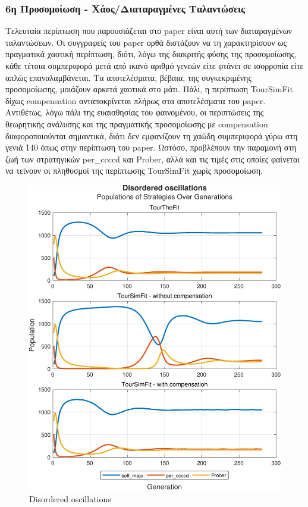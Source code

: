 \documentclass[12pt]{article}
\begin{document}
\subsubsection{6η Προσομοίωση - Χάος/Διαταραγμένες Ταλαντώσεις}
Τελευταία περίπτωση που παρουσιάζεται στο paper είναι αυτή των διαταραγμένων ταλαντώσεων. Οι συγγραφείς του paper ορθά διστάζουν να τη χαρακτηρίσουν ως πραγματικά χαοτική περίπτωση, διότι, λόγω της διακριτής φύσης της προσομοίωσης, κάθε τέτοια συμπεριφορά μετά από ικανό αριθμό γενεών είτε φτάνει σε ισορροπία είτε απλώς επαναλαμβάνεται. Τα αποτελέσματα, βέβαια, της συγκεκριμένης προσομοίωσης, μοιάζουν αρκετά χαοτικά στο μάτι. Πάλι, η περίπτωση TourSimFit δίχως compensation ανταποκρίνεται πλήρως στα αποτελέσματα του paper. Αντιθέτως, λόγω πάλι της ευαισθησίας του φαινομένου, οι περιπτώσεις της θεωρητικής ανάλυσης και της πραγματικής προσομοίωσης με compensation διαφοροποιούνται σημαντικά, διότι δεν εμφανίζουν τη χαώδη συμπεριφορά γύρω στη γενιά 140 όπως στην περίπτωση του paper. Ωστόσο, προβλέπουν την παραμονή στη ζωή των στρατηγικών per\_ccccd και Prober, αλλά και τις τιμές στις οποίες φαίνεται να τείνουν οι πληθυσμοί της περίπτωσης TourSimFit χωρίς προσομοίωση.
	\begin{figure}[h]
	      \centering
	      \includegraphics[scale=0.8]{Disordered oscillations.pdf}
	      \caption{Disordered oscillations}
	\end{figure}
\end{document}

